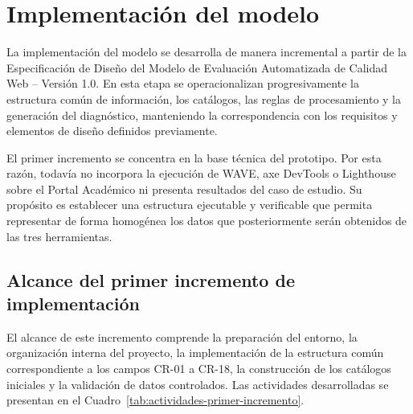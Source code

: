 
\section{Implementación del modelo}

La implementación del modelo se desarrolla de manera incremental a partir de
la Especificación de Diseño del Modelo de Evaluación Automatizada de Calidad
Web -- Versión 1.0. En esta etapa se operacionalizan progresivamente la
estructura común de información, los catálogos, las reglas de procesamiento y
la generación del diagnóstico, manteniendo la correspondencia con los
requisitos y elementos de diseño definidos previamente.

El primer incremento se concentra en la base técnica del prototipo. Por esta
razón, todavía no incorpora la ejecución de WAVE, axe DevTools o Lighthouse
sobre el Portal Académico ni presenta resultados del caso de estudio. Su
propósito es establecer una estructura ejecutable y verificable que permita
representar de forma homogénea los datos que posteriormente serán obtenidos de
las tres herramientas.

\subsection{Alcance del primer incremento de implementación}

El alcance de este incremento comprende la preparación del entorno, la
organización interna del proyecto, la implementación de la estructura común
correspondiente a los campos CR-01 a CR-18, la construcción de los catálogos
iniciales y la validación de datos controlados. Las actividades desarrolladas
se presentan en el Cuadro~\ref{tab:actividades-primer-incremento}.

